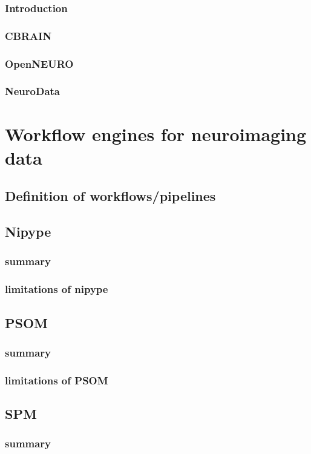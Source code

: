 \documentclass{report}
\begin{document}
        		\subsection{Introduction}
		\subsection{CBRAIN}
		\subsection{OpenNEURO}
		\subsection{NeuroData}
\chapter{Workflow engines for neuroimaging data}
	\section{Definition of workflows/pipelines}
	\section{Nipype}
		\subsection{summary}
		\subsection{limitations of nipype}
	\section{PSOM}
		\subsection{summary}
		\subsection{limitations of PSOM}
	\section{SPM}
		\subsection{summary}
\end{document}
